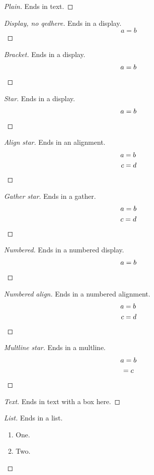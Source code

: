 \documentclass{article}
\begin{document}
\begin{proof}[Plain]
Ends in text.
\end{proof}
\begin{proof}[Display, no qedhere]
Ends in a display.
\[ a = b \]
\end{proof}
\begin{proof}[Bracket]
Ends in a display.
\[ a = b \qedhere \]
\end{proof}
\begin{proof}[Star]
Ends in a display.
\begin{equation*} a = b \qedhere \end{equation*}
\end{proof}
\begin{proof}[Align star]
Ends in an alignment.
\begin{align*} a &= b \\ c &= d \qedhere \end{align*}
\end{proof}
\begin{proof}[Gather star]
Ends in a gather.
\begin{gather*} a = b \\ c = d \qedhere \end{gather*}
\end{proof}
\begin{proof}[Numbered]
Ends in a numbered display.
\begin{equation} a = b \qedhere \end{equation}
\end{proof}
\begin{proof}[Numbered align]
Ends in a numbered alignment.
\begin{align} a &= b \\ c &= d \qedhere \end{align}
\end{proof}
\begin{proof}[Multline star]
Ends in a multline.
\begin{multline*} a = b \\ = c \qedhere \end{multline*}
\end{proof}
\begin{proof}[Text]
Ends in text with a box here. \qedhere
\end{proof}
\begin{proof}[List]
Ends in a list.
\begin{enumerate}
\item One.
\item Two. \qedhere
\end{enumerate}
\end{proof}
\end{document}
